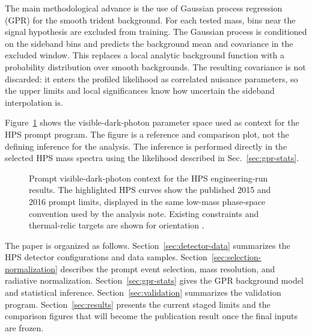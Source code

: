 The main methodological advance is the use of Gaussian process regression (GPR) for
the smooth trident background. For each tested mass, bins near the signal hypothesis
are excluded from training. The Gaussian process is conditioned on the sideband bins
and predicts the background mean and covariance in the excluded window. This replaces
a local analytic background function with a probability distribution over smooth
backgrounds. The resulting covariance is not discarded: it enters the profiled
likelihood as correlated nuisance parameters, so the upper limits and local
significances know how uncertain the sideband interpolation is.

Figure~\ref{fig:intro-context} shows the visible-dark-photon parameter space used as
context for the HPS prompt program. The figure is a reference and comparison plot, not
the defining inference for the analysis. The inference is performed directly in the
selected HPS mass spectra using the likelihood described in Sec.~\ref{sec:gpr-stats}.

\begin{figure}[t]
\centering
{}
\caption{Prompt visible-dark-photon context for the HPS engineering-run results. The
highlighted HPS curves show the published 2015 and 2016 prompt limits, displayed in
the same low-mass phase-space convention used by the analysis note. Existing
constraints and thermal-relic targets are shown for orientation
\cite{HPS2015DarkPhoton,HPS2016PromptLong,BaBarDarkPhoton2014,KLOE2013,KLOE22015,
A1MAMI2014,APEX2011,NA48DarkPhoton2015,HADESDarkPhoton2014,PHENIXDarkPhoton2015,
NA64DarkPhoton2018,NA64X17Visible2021,LHCbDarkPhoton2020,DarkCast2018}.}
\label{fig:intro-context}
\end{figure}

The paper is organized as follows. Section~\ref{sec:detector-data} summarizes the HPS
detector configurations and data samples. Section~\ref{sec:selection-normalization}
describes the prompt event selection, mass resolution, and radiative normalization.
Section~\ref{sec:gpr-stats} gives the GPR background model and statistical inference.
Section~\ref{sec:validation} summarizes the validation program. Section~\ref{sec:results}
presents the current staged limits and the comparison figures that will become the
publication result once the final inputs are frozen.
